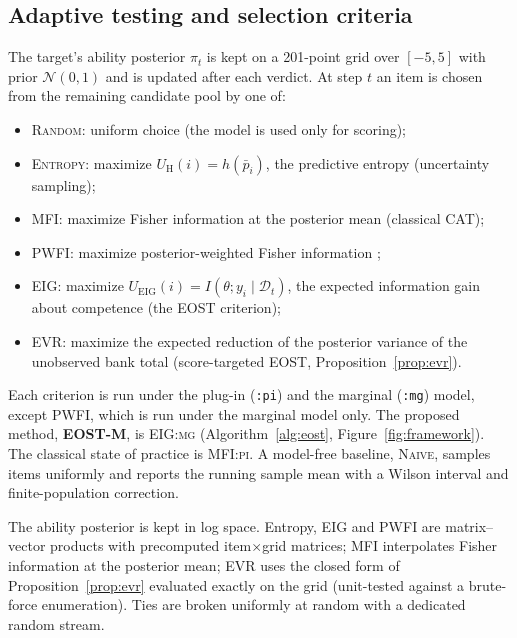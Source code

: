 \subsection{Adaptive testing and selection criteria}
The target's ability posterior $\pi_t$ is kept on a 201-point grid over
$[-5,5]$ with prior $\mathcal N(0,1)$ and is updated after each verdict. At
step $t$ an item is chosen from the remaining candidate pool by one of:
\begin{itemize}\itemsep0pt
\item \textsc{Random}: uniform choice (the model is used only for scoring);
\item \textsc{Entropy}: maximize $U_{\mathrm H}(i)=h(\bar p_i)$, the predictive entropy
(uncertainty sampling);
\item \textsc{MFI}: maximize Fisher information at the posterior mean (classical CAT);
\item \textsc{PWFI}: maximize posterior-weighted Fisher information \citep{vanderlinden1998bayesian};
\item \textsc{EIG}: maximize $U_{\mathrm{EIG}}(i)=I(\theta;y_i\mid\mathcal D_t)$, the
expected information gain about competence (the EOST criterion);
\item \textsc{EVR}: maximize the expected reduction of the posterior variance of
the unobserved bank total (score-targeted EOST, Proposition~\ref{prop:evr}).
\end{itemize}
Each criterion is run under the plug-in (\texttt{:pi}) and the marginal
(\texttt{:mg}) model, except PWFI, which is run under the marginal model only. The proposed method, \textbf{EOST-M}, is \textsc{EIG:mg} (Algorithm~\ref{alg:eost}, Figure~\ref{fig:framework}).
The classical state of practice is \textsc{MFI:pi}. A model-free baseline,
\textsc{Naive}, samples items uniformly and reports the running sample mean
with a Wilson interval and finite-population correction.

The ability posterior is kept in log space. Entropy, EIG and PWFI are matrix--vector
products with precomputed item$\times$grid matrices; MFI interpolates Fisher information at
the posterior mean; EVR uses the closed form of Proposition~\ref{prop:evr} evaluated exactly
on the grid (unit-tested against a brute-force enumeration). Ties are broken uniformly at
random with a dedicated random stream.

